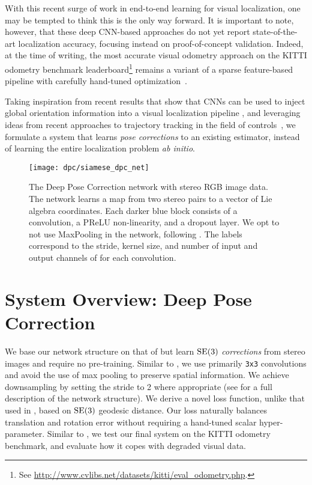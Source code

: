 With this recent surge of work in end-to-end learning for visual localization, one may be tempted to think this is the only way forward. It is important to note, however, that these deep CNN-based approaches do not yet report state-of-the-art localization accuracy, focusing instead on proof-of-concept validation. Indeed, at the time of writing, the most accurate visual odometry approach on the KITTI odometry benchmark leaderboard\footnote{See \url{http://www.cvlibs.net/datasets/kitti/eval_odometry.php}.} remains a variant of a sparse feature-based pipeline with carefully hand-tuned optimization~\citep{Cvisic2015-mt}. 

Taking inspiration from recent results that show that CNNs can be used to inject global orientation information into a visual localization pipeline \citep{2017_Peretroukhin_Reducing}, and leveraging ideas from recent approaches to trajectory tracking in the field of controls~\citep{2017_Li_Deep, Punjani2015-pj}, we formulate a system that learns \textit{pose corrections} to an existing estimator, instead of learning the entire localization problem \textit{ab initio}.

\begin{figure}
	\centering
	\texttt{[image: dpc/siamese\_dpc\_net]}
	\caption{The Deep Pose Correction network with stereo RGB image data. 
	The network learns a map from two stereo pairs to a vector of Lie algebra coordinates. 
	Each darker blue block consists of a convolution, a PReLU non-linearity, and a dropout layer. We opt to not use MaxPooling in the network, following \cite{Handa2016-hm}.
	The labels correspond to the stride, kernel size, and number of input and output channels of for each convolution.}
	\label{fig:dpc_net}
	\vspace{-1em}
\end{figure}

\section{System Overview: Deep Pose Correction}

We base our network structure on that of \citep{Handa2016-hm} but learn $\mathrm{SE}(3)$ \textit{corrections} from stereo images and require no pre-training. Similar to \citep{Handa2016-hm}, we use primarily \texttt{3x3} convolutions and avoid the use of max pooling to preserve spatial information. We achieve downsampling by setting the stride to 2 where appropriate (see  for a full description of the network structure). We derive a novel loss function, unlike that used in \cite{Kendall2017-u, Melekhov2017-dl, Oliveira2017-lt}, based on $\mathrm{SE}(3)$ geodesic distance. Our loss naturally balances translation and rotation error without requiring a hand-tuned scalar hyper-parameter. Similar to \citep{Costante2016-hb}, we test our final system on the KITTI odometry benchmark, and evaluate how it copes with degraded visual data. 


